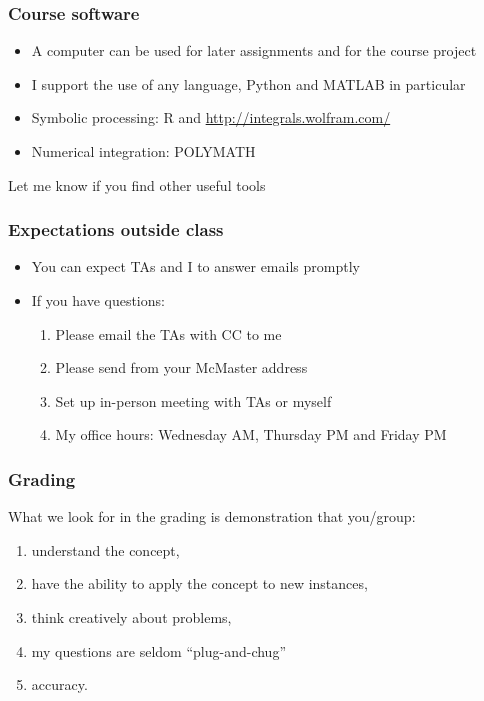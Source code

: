 \begin{frame}\frametitle{Course software}
	\begin{itemize}
		\item	A computer can be used for later assignments and for the course project 
		\item	I support the use of any language, Python and MATLAB in particular
		\item	Symbolic processing: R and {\small\href{http://integrals.wolfram.com/}{http://integrals.wolfram.com/}}
		\item	Numerical integration: POLYMATH
	\end{itemize}
	\vspace{12pt}
	Let me know if you find other useful tools
\end{frame}

\begin{frame}\frametitle{Expectations outside class}
	\begin{itemize}
		\item	You can expect TAs and I to answer emails promptly 
		\item	If you have questions: 
		\begin{enumerate}
			\item	Please email the TAs with CC to me \hfill {\tiny{\color{myOrange}{$\longleftarrow$ hopefully this solves your problem}}}
			\item	Please send from your McMaster address
			\item	Set up in-person meeting with TAs or myself 
			\item	My office hours: Wednesday AM, Thursday PM and Friday PM
		\end{enumerate}
	\end{itemize}
\end{frame}

\begin{frame}\frametitle{Grading}
	What we look for in the grading is demonstration that you/group: 
	\begin{enumerate}
		\item	understand the concept, 
		\item	have the ability to apply the concept to new instances, 
		\item	think creatively about problems, 
		\item	my questions are seldom ``plug-and-chug''
		\item	accuracy. 
	\end{enumerate}
\end{frame}

